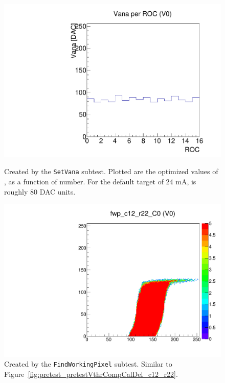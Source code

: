 \begin{figure}[!Hp]
\centering
\begin{minipage}{0.45\textwidth}
  \includegraphics[width=1.0\textwidth]{figures/pretest_VanaSettings.pdf}
  \caption{Created by the {\tt SetVana} subtest.  
    Plotted are the optimized values of \vana, as a function of \roc number.
    For the default \iana target of 24 mA, \vana is roughly 80 DAC units.}
  \label{fig:pretest_VanaSettings}
\end{minipage}
\hspace{0.3cm}
\begin{minipage}{0.45\textwidth}
  \includegraphics[width=1.0\textwidth]{figures/pretest_fwp_c12_r22.pdf}
  \caption{Created by the {\tt FindWorkingPixel} subtest.
  Similar to Figure~\ref{fig:pretest_pretestVthrCompCalDel_c12_r22}.}
  \label{fig:pretest_fwp_c12_r22}
\end{minipage}
\end{figure}

